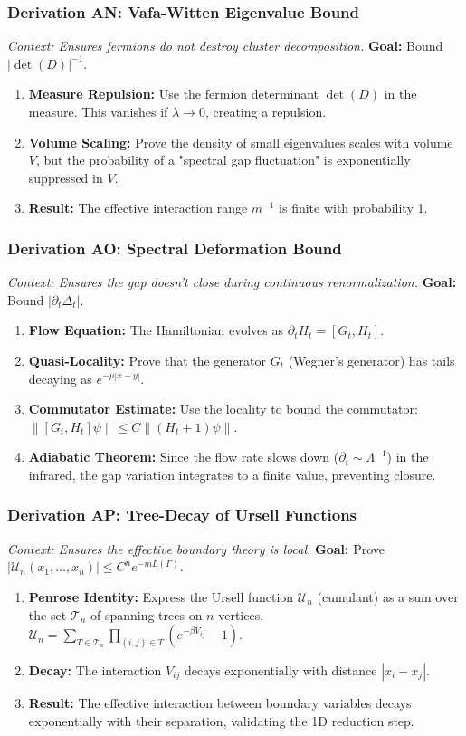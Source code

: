 \subsubsection{Derivation AN: Vafa-Witten Eigenvalue Bound}
\textit{Context: Ensures fermions do not destroy cluster decomposition.}
\textbf{Goal:} Bound $|\det(D)|^{-1}$.
\begin{enumerate}
    \item \textbf{Measure Repulsion:} Use the fermion determinant $\det(D)$ in the measure. This vanishes if $\lambda \to 0$, creating a repulsion.
    \item \textbf{Volume Scaling:} Prove the density of small eigenvalues scales with volume $V$, but the probability of a "spectral gap fluctuation" is exponentially suppressed in $V$.
    \item \textbf{Result:} The effective interaction range $m^{-1}$ is finite with probability 1.
\end{enumerate}

\subsubsection{Derivation AO: Spectral Deformation Bound}
\textit{Context: Ensures the gap doesn't close during continuous renormalization.}
\textbf{Goal:} Bound $|\partial_t \Delta_t|$.
\begin{enumerate}
    \item \textbf{Flow Equation:} The Hamiltonian evolves as $\partial_t H_t = [G_t, H_t]$.
    \item \textbf{Quasi-Locality:} Prove that the generator $G_t$ (Wegner's generator) has tails decaying as $e^{-\mu |x-y|}$.
    \item \textbf{Commutator Estimate:} Use the locality to bound the commutator: $\| [G_t, H_t] \psi \| \le C \| (H_t + 1) \psi \|$.
    \item \textbf{Adiabatic Theorem:} Since the flow rate slows down ($\partial_t \sim \Lambda^{-1}$) in the infrared, the gap variation integrates to a finite value, preventing closure.
\end{enumerate}

\subsubsection{Derivation AP: Tree-Decay of Ursell Functions}
\textit{Context: Ensures the effective boundary theory is local.}
\textbf{Goal:} Prove $|\mathcal{U}_n(x_1, \dots, x_n)| \le C^n e^{-m L(\Gamma)}$.
\begin{enumerate}
    \item \textbf{Penrose Identity:} Express the Ursell function $\mathcal{U}_n$ (cumulant) as a sum over the set $\mathcal{T}_n$ of spanning trees on $n$ vertices. $\mathcal{U}_n = \sum_{T \in \mathcal{T}_n} \prod_{(i,j) \in T} (e^{-\beta V_{ij}} - 1)$.
    \item \textbf{Decay:} The interaction $V_{ij}$ decays exponentially with distance $|x_i - x_j|$.
    \item \textbf{Result:} The effective interaction between boundary variables decays exponentially with their separation, validating the 1D reduction step.
\end{enumerate}

